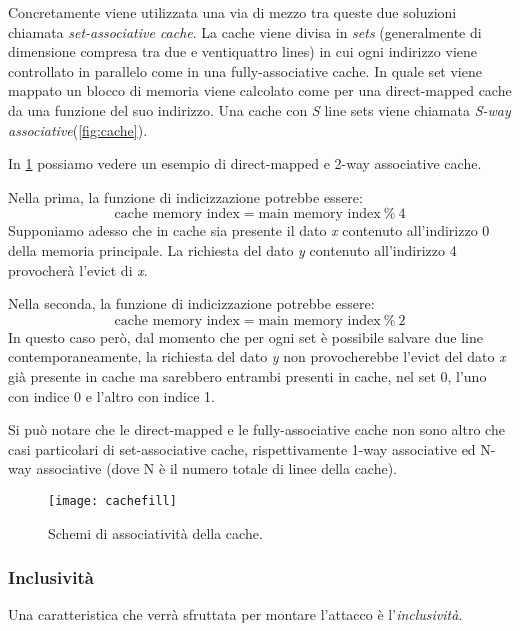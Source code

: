 				Concretamente viene utilizzata una via di mezzo tra queste due soluzioni chiamata \emph{set-associative cache}. La cache viene divisa in \emph{sets} (generalmente di dimensione compresa tra due e ventiquattro lines) in cui ogni indirizzo viene controllato in parallelo come in una fully-associative cache. In quale set viene mappato un blocco di memoria viene calcolato come per una direct-mapped cache da una funzione del suo indirizzo. Una cache con \emph{S} line sets viene chiamata \emph{S-way associative}(\cref{fig:cache}). 
				
				In \cref{fig:cachefill} possiamo vedere un esempio di direct-mapped e 2-way associative cache. 
				
				Nella prima, la funzione di indicizzazione potrebbe essere: $$\text{cache memory index} = \text{main memory index}\ \% \ 4$$ Supponiamo adesso che in cache sia presente il dato \emph{x} contenuto all'indirizzo $0$ della memoria principale. La richiesta del dato \emph{y} contenuto all'indirizzo 4 provocherà l'evict di \emph{x}.
				
				Nella seconda, la funzione di indicizzazione potrebbe essere: $$\text{cache memory index} = \text{main memory index}\ \% \ 2$$ In questo caso però, dal momento che per ogni set è possibile salvare due line contemporaneamente, la richiesta del dato \emph{y} non provocherebbe l'evict del dato \emph{x} già presente in cache ma sarebbero entrambi presenti in cache, nel set $0$, l'uno con indice $0$ e l'altro con indice 1.
				
				Si può notare che le direct-mapped e le fully-associative cache non sono altro che casi particolari di set-associative cache, rispettivamente 1-way associative ed N-way associative (dove N è il numero totale di linee della cache).
				
				\begin{figure}
					\begin{center}
						\texttt{[image: cachefill]}
						\caption{Schemi di associatività della cache.}
						\label{fig:cachefill}
					\end{center}
				\end{figure}
				
			\subsubsection{Inclusività}
				Una caratteristica che verrà sfruttata per montare l'attacco è l'\emph{inclusività}. 
				
